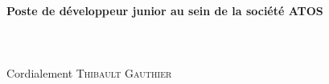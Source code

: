 
\begin{titlepage}





  {\large \textbf{Poste de développeur junior au sein de la société ATOS}}
  \\\hr\\[0.5cm]
  \\\\
  \lipsum
  \flushright Cordialement \textsc{Thibault Gauthier}
\end{titlepage}
